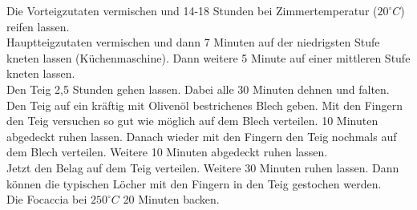 \begin{tcolorbox}
    Die Vorteigzutaten vermischen und 14-18 Stunden bei Zimmertemperatur ($20^\circ C$) reifen lassen.\\
    Hauptteigzutaten vermischen und dann 7 Minuten auf der niedrigsten Stufe kneten lassen (Küchenmaschine).
    Dann weitere 5 Minute auf einer mittleren Stufe kneten lassen.\\
    Den Teig 2,5 Stunden gehen lassen.
    Dabei alle 30 Minuten dehnen und falten.\\
    Den Teig auf ein kräftig mit Olivenöl bestrichenes Blech geben.
    Mit den Fingern den Teig versuchen so gut wie möglich auf dem Blech verteilen.
    10 Minuten abgedeckt ruhen lassen.
    Danach wieder mit den Fingern den Teig nochmals auf dem Blech verteilen.
    Weitere 10 Minuten abgedeckt ruhen lassen.\\
    Jetzt den Belag auf dem Teig verteilen.
    Weitere 30 Minuten ruhen lassen.
    Dann können die typischen  \glqq Löcher \grqq{} mit den Fingern in den Teig gestochen werden.\\
    Die Focaccia bei $250^\circ C$ 20 Minuten backen.
\end{tcolorbox}
\newpage